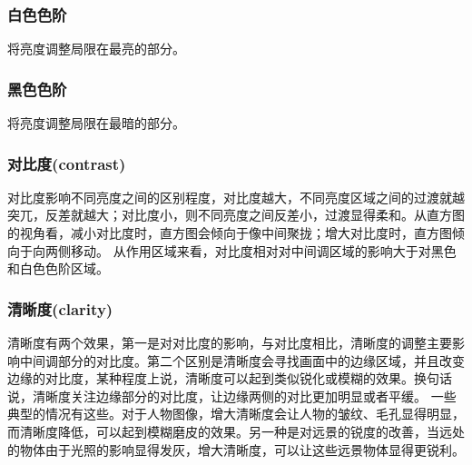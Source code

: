 \documentclass{ctexart}
\begin{document}
\subsubsection{白色色阶}
将亮度调整局限在最亮的部分。

\subsubsection{黑色色阶}
将亮度调整局限在最暗的部分。

\subsubsection{对比度(contrast)}
对比度影响不同亮度之间的区别程度，对比度越大，不同亮度区域之间的过渡就越突兀，反差就越大；对比度小，则不同亮度之间反差小，过渡显得柔和。从直方图的视角看，减小对比度时，直方图会倾向于像中间聚拢；增大对比度时，直方图倾向于向两侧移动。
从作用区域来看，对比度相对对中间调区域的影响大于对黑色和白色色阶区域。

\subsubsection{清晰度(clarity)}
清晰度有两个效果，第一是对对比度的影响，与对比度相比，清晰度的调整主要影响中间调部分的对比度。第二个区别是清晰度会寻找画面中的边缘区域，并且改变边缘的对比度，某种程度上说，清晰度可以起到类似锐化或模糊的效果。换句话说，清晰度关注边缘部分的对比度，让边缘两侧的对比更加明显或者平缓。
一些典型的情况有这些。对于人物图像，增大清晰度会让人物的皱纹、毛孔显得明显，而清晰度降低，可以起到模糊磨皮的效果。另一种是对远景的锐度的改善，当远处的物体由于光照的影响显得发灰，增大清晰度，可以让这些远景物体显得更锐利。


\end{document}
